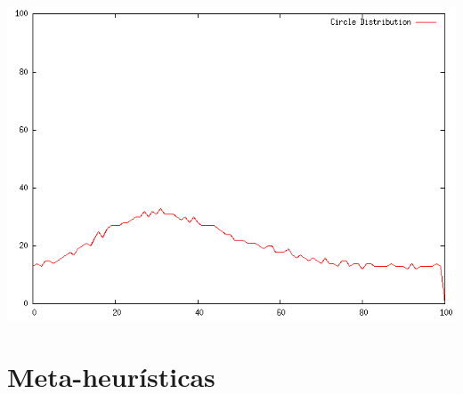 {
    \centering
    \includegraphics[width=0.55\linewidth]{figuras/DistribuicaoCircle.png}
    \label{fig:1DCircle}
}



\section{Meta-heurísticas}


